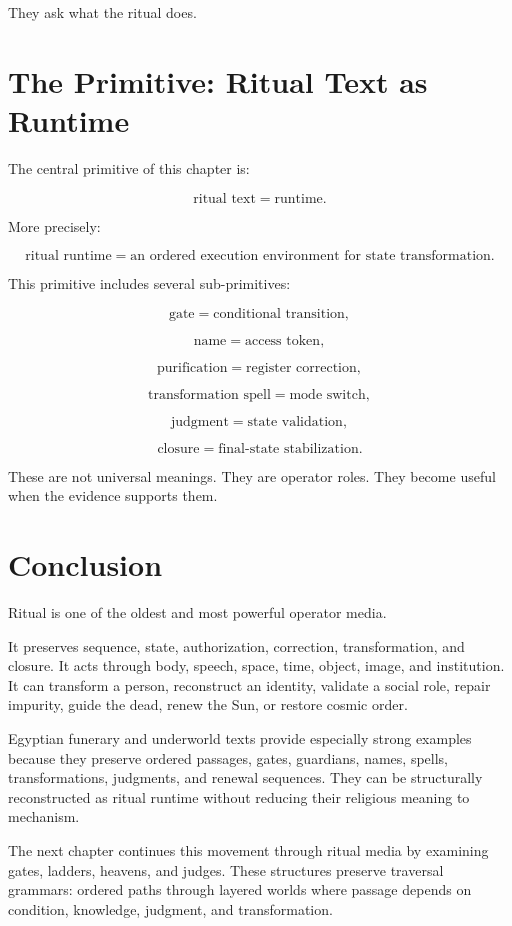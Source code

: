 \documentclass[11pt]{book}
\begin{document}
They ask what the ritual does.

\section{The Primitive: Ritual Text as Runtime}

The central primitive of this chapter is:

\[
\text{ritual text} = \text{runtime}.
\]

More precisely:

\[
\text{ritual runtime} = \text{an ordered execution environment for state transformation}.
\]

This primitive includes several sub-primitives:

\[
\text{gate} = \text{conditional transition},
\]

\[
\text{name} = \text{access token},
\]

\[
\text{purification} = \text{register correction},
\]

\[
\text{transformation spell} = \text{mode switch},
\]

\[
\text{judgment} = \text{state validation},
\]

\[
\text{closure} = \text{final-state stabilization}.
\]

These are not universal meanings. They are operator roles. They become useful when the evidence supports them.

\section{Conclusion}

Ritual is one of the oldest and most powerful operator media.

It preserves sequence, state, authorization, correction, transformation, and closure. It acts through body, speech, space, time, object, image, and institution. It can transform a person, reconstruct an identity, validate a social role, repair impurity, guide the dead, renew the Sun, or restore cosmic order.

Egyptian funerary and underworld texts provide especially strong examples because they preserve ordered passages, gates, guardians, names, spells, transformations, judgments, and renewal sequences. They can be structurally reconstructed as ritual runtime without reducing their religious meaning to mechanism.

The next chapter continues this movement through ritual media by examining gates, ladders, heavens, and judges. These structures preserve traversal grammars: ordered paths through layered worlds where passage depends on condition, knowledge, judgment, and transformation.
\end{document}
